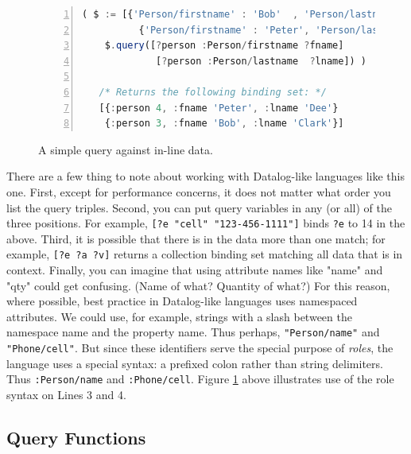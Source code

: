 \documentclass[9pt,letterpaper]{article}
\newcommand{\stt}[1]{\texttt{#1}}
\begin{document}
\begin{figure}[H]
  \caption{A simple query against in-line data.}
  \label{code:simple-binding-set}
\begin{lstlisting}[language=JavaScript,numberstyle=\scriptsize,basicstyle=\ttfamily\scriptsize,numbers=left,stepnumber=1,breaklines=true]
  ( $ := [{'Person/firstname' : 'Bob'  , 'Person/lastname' : 'Clark'},
          {'Person/firstname' : 'Peter', 'Person/lastname' : 'Dee'}];
    $.query([?person :Person/firstname ?fname]
             [?person :Person/lastname  ?lname]) )

   /* Returns the following binding set: */
   [{:person 4, :fname 'Peter', :lname 'Dee'}
    {:person 3, :fname 'Bob', :lname 'Clark'}]
\end{lstlisting}
\end{figure}

There are a few thing to note about working with Datalog-like languages like this one.
First, except for performance concerns, it does not matter what order you list the query triples.
Second, you can put query variables in any (or all) of the three positions.
For example, \stt{[?e "cell" "123-456-1111"]} binds \stt{?e} to 14 in the above.
Third, it is possible that there is in the data more than one match;
for example, \stt{[?e ?a ?v]} returns a collection binding set matching all data that is in context.
Finally, you can imagine that using attribute names like "name" and "qty" could get confusing. (Name of what? Quantity of what?)
For this reason, where possible, best practice in Datalog-like languages uses namespaced attributes.
We could use, for example, strings with a slash between the namespace name and the property name.
Thus perhaps, \stt{"Person/name"} and \stt{"Phone/cell"}.
But since these identifiers serve the special purpose of \textit{roles}, the language uses a special syntax: a prefixed colon rather than string delimiters.
Thus \stt{:Person/name} and \stt{:Phone/cell}.
Figure \ref{code:simple-binding-set} above illustrates use of the role syntax on Lines 3 and 4.

\subsection{Query Functions}
\end{document}
